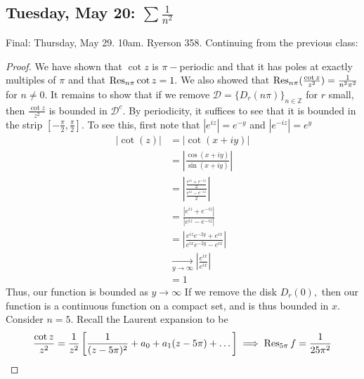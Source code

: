 \documentclass[10pt, oneside]{article}
\newcommand{\bbZ}{\mathbb{Z}}
\theoremstyle{definition}
\newcommand{\bbZ}{\mathbb{Z}}
\begin{document}
\subsection{Tuesday, May 20: $\sum \frac{1}{n^2}$}
Final: Thursday, May 29. 10am. Ryerson 358. Continuing from the previous class:
\begin{proof}
    We have shown that $\cot z$ is $\pi-$periodic and that it has poles at exactly multiples of $\pi$ and that $\Res_{n\pi} \cot z = 1.$ We also showed that $\Res_{n\pi}(\frac{\cot z}{z^2}) = \frac{1}{n^2 \pi^2}$ for $n \neq 0.$ It remains to show that if we remove $\mathcal{D} = \{D_{r}(n\pi)\}_{n \in \bbZ}$ for $r$ small, then $\frac{\cot z}{z^2}$ is bounded in $\mathcal{D}^c.$ By periodicity, it suffices to see that it is bounded  in the strip $[-\frac{\pi}{2}, \frac{\pi}{2}].$ To see this, first note that $|e^{iz}| = e^{-y}$ and $|e^{-iz}| = e^y$
    \begin{align*}
        |\cot (z)| &= |\cot (x + iy)|\\
        &= \left|\frac{\cos (x + iy)}{\sin (x + iy)}\right|\\
        &= \left|\frac{\frac{e^{iz} + e^{-iz}}{2}}{\frac{e^{iz} - e^{-iz}}{2}}\right|\\
        &= \frac{|e^{iz} + e^{-iz}|}{|e^{iz} - e^{-iz}|}\\
        &= |\frac{e^{iz}e^{-2y} + e^{ix}}{e^{ix}e^{-2y} - e^{ix}}|\\
        &\xrightarrow[y\to \infty]{} |\frac{e^{ix}}{e^{ix}}|\\
        &= 1
    \end{align*}
    Thus, our function is bounded as $y\to \infty$ If we remove the disk $D_r(0),$ then our function is a continuous function on a compact set, and is thus bounded in $x.$ Consider $n = 5.$ Recall the Laurent expansion to be 
    \[\frac{\cot z}{z^2} = \frac{1}{z^2}\left[\frac{1}{(z - 5\pi)^2} + a_0 + a_1(z - 5\pi) + \dots\right] \implies \Res_{5\pi }f =  \frac{1}{25\pi^2}\]


\end{proof}
\end{document}
